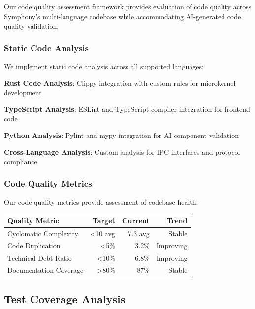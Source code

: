 Our code quality assessment framework provides evaluation of code quality across Symphony's multi-language codebase while accommodating AI-generated code quality validation.

\subsubsection*{Static Code Analysis}

We implement static code analysis across all supported languages:

\begin{expandedlist}
    \item \textbf{Rust Code Analysis}: Clippy integration with custom rules for microkernel development
    \item \textbf{TypeScript Analysis}: ESLint and TypeScript compiler integration for frontend code
    \item \textbf{Python Analysis}: Pylint and mypy integration for AI component validation
    \item \textbf{Cross-Language Analysis}: Custom analysis for IPC interfaces and protocol compliance
\end{expandedlist}

\subsubsection*{Code Quality Metrics}

Our code quality metrics provide assessment of codebase health:

\begin{center}
\begin{tabular}{@{}lrrr@{}}
\toprule
\textbf{Quality Metric} & \textbf{Target} & \textbf{Current} & \textbf{Trend} \\
\midrule
Cyclomatic Complexity & <10 avg & 7.3 avg & Stable \\
Code Duplication & <5\% & 3.2\% & Improving \\
Technical Debt Ratio & <10\% & 6.8\% & Improving \\
Documentation Coverage & >80\% & 87\% & Stable \\
\bottomrule
\end{tabular}
\end{center}

\subsection*{Test Coverage Analysis}

